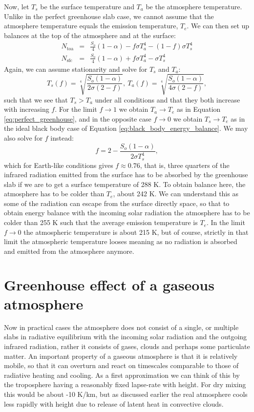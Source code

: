 \documentclass[12pt]{book}
\begin{document}
Now, let $T_s$ be the surface temperature and $T_a$ be the atmosphere temperature. Unlike in the perfect greenhouse slab case, we cannot assume that the atmosphere temperature equals the emission temperature, $T_e$. We can then set up balances at the top of the atmosphere and at the surface:
\begin{eqnarray}
N_\textrm{toa} &=&  \frac{S_o}{4}(1-\alpha) - f \sigma T_a^4 - (1-f)\sigma T_s^4 \nonumber \\ 
N_\textrm{sfc} &=&  \frac{S_o}{4}(1-\alpha) + f \sigma T_a^4 - \sigma T_s^4 \nonumber 
\end{eqnarray}
Again, we can assume stationarity and solve for $T_s$ and $T_a$:
\begin{equation}
T_s(f) = \sqrt[4]{\frac{S_o(1-\alpha)}{2\sigma(2-f)}}, \ T_a(f) =  \sqrt[4]{\frac{S_o(1-\alpha)}{4\sigma(2-f)}},
\label{eq:partial_absorbtion_solution}
\end{equation}
such that we see that $T_s > T_a$ under all conditions and that they both increase with increasing $f$. For the limit $f \rightarrow 1$ we obtain $T_a \rightarrow T_e$ as in Equation \ref{eq:perfect_greenhouse}, and in the opposite case $f \rightarrow 0$ we obtain $T_s \rightarrow T_e$ as in the ideal black body case of Equation \ref{eq:black_body_energy_balance}. We may also solve for $f$ instead:
\begin{equation}
f = 2 - \frac{S_o(1-\alpha)}{2\sigma T_s^4},
\end{equation}
which for Earth-like conditions gives $f \approx 0.76$, that is, three quarters of the infrared radiation emitted from the surface has to be absorbed by the greenhouse slab if we are to get a surface temperature of 288 K. To obtain balance here, the atmosphere has to be colder than $T_e$, about 242 K. We can understand this as some of the radiation can escape from the surface directly space, so that to obtain energy balance with the incoming solar radiation the atmosphere has to be colder than 255 K such that the average emission temperature is $T_e$. In the limit $f \rightarrow 0$ the atmospheric temperature is about 215 K, but of course, strictly in that limit the atmospheric temperature looses meaning as no radiation is absorbed and emitted from the atmosphere anymore.


\section{Greenhouse effect of a gaseous atmosphere}
Now in practical cases the atmosphere does not consist of a single, or multiple slabs in radiative equilibrium with the incoming solar radiation and the outgoing infrared radiation, rather it consists of gases, clouds and perhaps some particulate matter. An important property of a gaseous atmosphere is that it is relatively mobile, so that it can overturn and react on timescales comparable to those of radiative heating and cooling. As a first approximation we can think of this by the troposphere having a reasonably fixed lapse-rate with height. For dry mixing this would be about -10 K/km, but as discussed earlier the real atmosphere cools less rapidly with height due to release of latent heat in convective clouds.
\end{document}
